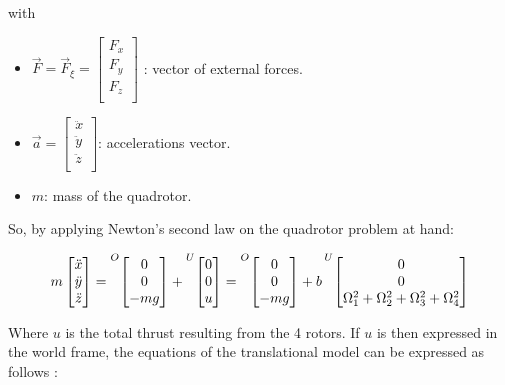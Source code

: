 \documentclass{thesisreport}
\begin{document}
with



\begin{itemize}
	\item $\overrightarrow{F}=\overrightarrow{F}_{\xi}=\begin{bmatrix}
F_x \\
F_y \\
F_z \\
\end{bmatrix}$ : vector of external forces.

\item $\overrightarrow{a} = \begin{bmatrix}
\ddot{x} \\
\ddot{y} \\
\ddot{z} \\
\end{bmatrix}$: accelerations vector.
\item $m$: mass of the quadrotor.
\end{itemize}

So, by applying Newton's second law on the quadrotor problem at hand:

\begin{equation*}
	m\begin{bmatrix}
	\ddot{x}\\
	\ddot{y}\\
	\ddot{z}\\
	\end{bmatrix} = \prescript{O}{}{\begin{bmatrix}
	0 \\
	0 \\
	-mg 
	\end{bmatrix}} + \prescript{U}{}{\begin{bmatrix}
	0 \\
	0 \\
	u 
	\end{bmatrix}} = \prescript{O}{}{\begin{bmatrix}
	0 \\
	0 \\
	-mg 
	\end{bmatrix}} + b \prescript{U}{}{\begin{bmatrix}
	0 \\
	0 \\
	\Omega_1^2 + \Omega_2^2 + \Omega_3^2 + \Omega_4^2
	\end{bmatrix}}
\end{equation*}

Where $u$ is the total thrust resulting from the 4 rotors. If $u$ is then expressed in the world frame, the equations of the translational model can be expressed as follows \cite{Fantoni2016}:
\end{document}

